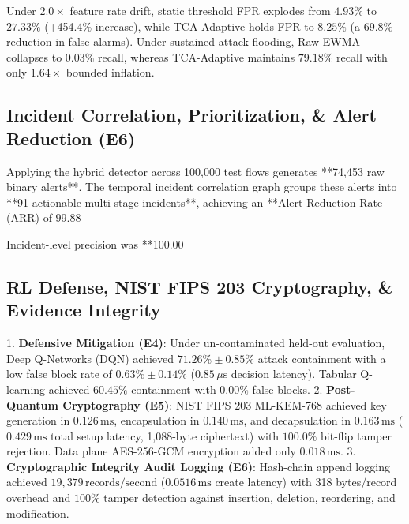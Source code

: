 \documentclass{ieeeaccess}
\begin{document}
Under $2.0\times$ feature rate drift, static threshold FPR explodes from $4.93\%$ to $27.33\%$ (+454.4\% increase), while TCA-Adaptive holds FPR to $8.25\%$ (a $69.8\%$ reduction in false alarms). Under sustained attack flooding, Raw EWMA collapses to $0.03\%$ recall, whereas TCA-Adaptive maintains $79.18\%$ recall with only $1.64\times$ bounded inflation.

\subsection{Incident Correlation, Prioritization, & Alert Reduction (E6)}
Applying the hybrid detector across 100,000 test flows generates **74,453 raw binary alerts**. The temporal incident correlation graph groups these alerts into **91 actionable multi-stage incidents**, achieving an **Alert Reduction Rate (ARR) of 99.88%

Incident-level precision was **100.00%

\subsection{RL Defense, NIST FIPS 203 Cryptography, & Evidence Integrity}
1. \textbf{Defensive Mitigation (E4)}: Under un-contaminated held-out evaluation, Deep Q-Networks (DQN) achieved $71.26\% \pm 0.85\%$ attack containment with a low false block rate of $0.63\% \pm 0.14\%$ ($0.85\,\mu\text{s}$ decision latency). Tabular Q-learning achieved $60.45\%$ containment with $0.00\%$ false blocks.
2. \textbf{Post-Quantum Cryptography (E5)}: NIST FIPS 203 ML-KEM-768 achieved key generation in $0.126\,\text{ms}$, encapsulation in $0.140\,\text{ms}$, and decapsulation in $0.163\,\text{ms}$ ($0.429\,\text{ms}$ total setup latency, 1,088-byte ciphertext) with $100.0\%$ bit-flip tamper rejection. Data plane AES-256-GCM encryption added only $0.018\,\text{ms}$.
3. \textbf{Cryptographic Integrity Audit Logging (E6)}: Hash-chain append logging achieved $19,379\,\text{records/second}$ ($0.0516\,\text{ms}$ create latency) with 318 bytes/record overhead and $100\%$ tamper detection against insertion, deletion, reordering, and modification.
\end{document}
